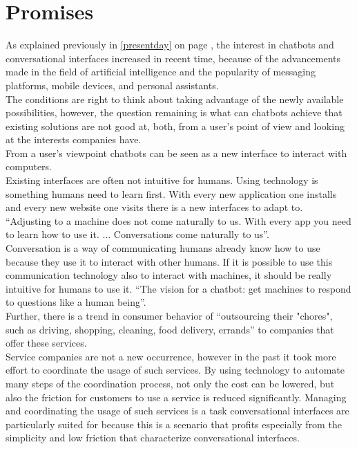 \section{Promises}


As explained previously in \ref{presentday} on page \pageref{presentday}, the interest in chatbots and conversational interfaces increased in recent time, because of the advancements made in the field of artificial intelligence and the popularity of messaging platforms, mobile devices, and personal assistants.
\\
The conditions are right to think about taking advantage of the newly available possibilities, however, the question remaining is what can chatbots achieve that existing solutions are not good at, both, from a user's point of view and looking at the interests companies have.
\\

From a user's viewpoint chatbots can be seen as a new interface to interact with computers.
\\
Existing interfaces are often not intuitive for humans.
Using technology is something humans need to learn first.
With every new application one installs and every new website one visits there is a new interfaces to adapt to.
\\
``Adjusting to a machine does not come naturally to us. With every app you need to learn how to use it. ... Conversations come naturally to us''\cite{techinasia}.
\\
Conversation is a way of communicating humans already know how to use because they use it to interact with other humans.
If it is possible to use this communication technology also to interact with machines, it should be really intuitive for humans to use it.
``The vision for a chatbot: get machines to respond to questions like a human being''\cite{techinasia}.
\\

Further, there is a trend in consumer behavior of ``outsourcing their "chores", such as driving, shopping, cleaning, food delivery, errands''\cite{chatbotbook} to companies that offer these services.
\\
Service companies are not a new occurrence, however in the past it took more effort to coordinate the usage of such services.
By using technology to automate many steps of the coordination process, not only the cost can be lowered,
but also the friction for customers to use a service is reduced significantly.
Managing and coordinating the usage of such services is a task conversational interfaces are particularly suited for because this is a scenario that profits especially from the simplicity and low friction that characterize conversational interfaces.
\\

